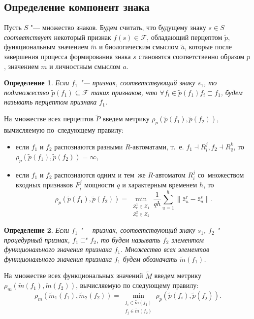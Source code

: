 \documentclass[a4paper, 12pt]{article}
\theoremstyle{break}
\newtheorem{Def}{Определение}
\numberwithin{equation}{section}
\begin{document}
	\subsection{Определение компонент знака}\label{subst:sign_comp}
	Пусть $S$ "--- множество знаков. Будем считать, что будущему знаку $s\in S$ \textit{соответствует} некоторый признак $f(s)\in\mathcal F$, обладающий перцептом $\tilde p$, функциональным значением $\tilde m$ и биологическим смыслом $\tilde a$, которые после завершения процесса формирования знака $s$ становятся соответственно образом $p$, значением $m$ и личностным смыслом $a$.
	
	\begin{Def}
		Если $f_1$ "--- признак, соответствующий знаку $s_1$, то подмножество $\tilde p(f_1)\subseteq\mathcal F$ таких признаков, что $\forall f_i\in\tilde p(f_1) f_i\sqsubset f_1$, будем называть перцептом признака $f_1$.
	\end{Def}
	
	На множестве всех перцептов $\tilde P$ введем метрику $\rho_p(\tilde p(f_1),\tilde p(f_2))$, вычисляемую по~следующему правилу:
	\begin{itemize}
		\item если $f_1$ и $f_2$ распознаются разными $R$-автоматами, т.~е. $f_1\dashv R_i^j, f_2\dashv R_q^k$, то $\rho_p(\tilde p(f_1),\tilde p(f_2))=\infty$,
		\item если $f_1$ и $f_2$ распознаются одним и тем~же $R$-автоматом $R_i^j$ со~множеством входных признаков $F_i^j$ мощности $q$ и характерным временем $h$, то
		\begin{equation*}
			\rho_p(\tilde p(f_1),\tilde p(f_2))=\min\limits_{\substack{Z_r^1\in Z_1\\Z_s^2\in Z_2}}\frac{1}{qh}\sum\limits_{u=1}^h\|\bar z_u^r-\bar z_u^s\|.
		\end{equation*} 
	\end{itemize}
	
	\begin{Def}
		Если $f_1$ "--- признак, соответствующий знаку $s_1$, $f_2$ "--- процедурный признак, $f_1\sqsubset^c f_2$, то будем называть $f_2$ элементом функционального значения признака $f_1$. Множество всех элементов функционального значения признака $f_1$ будем обозначать $\tilde m(f_1)$.
	\end{Def}
	
	На множестве всех функциональных значений $\tilde M$ введем метрику $\rho_m(\tilde m(f_1),\tilde m(f_2))$, вычисляемую по следующему правилу:
	\begin{equation}\label{eq:m_metr}
		\rho_m(\tilde m_1(f_1),\tilde m_2(f_2 ))=\min\limits_{\substack{f_i\in\tilde m(f_1 )\\f_j\in\tilde m(f_2 )}}\rho_p(\tilde p(f_i ),\tilde p(f_j )).
	\end{equation}
		
\end{document}
